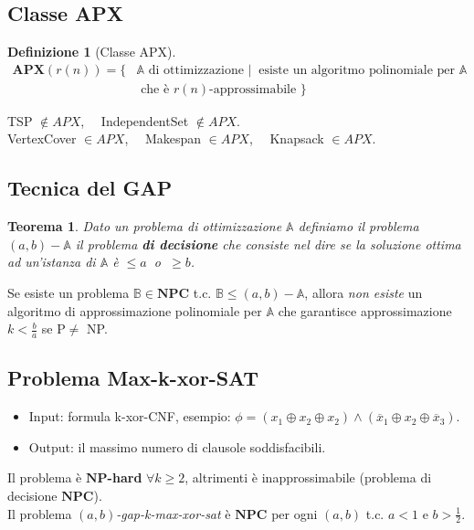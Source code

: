 \documentclass[a4paper]{article}
\newtheorem{thm}{Teorema}[subsection]
\theoremstyle{definition}
\newtheorem{definit}{Definizione}[subsection]
\newcommand{\np}{\mathbf{NP}}
\newcommand{\npc}{\mathbf{NPC}}
\newcommand{\apx}{\mathbf{APX}}
\newcommand{\prob}[1]{\mathbb{#1}}
\begin{document}
		\subsection{Classe APX}
			\begin{definit}[Classe APX]
				\begin{align*}
					\apx(r(n)) = \big\lbrace & \prob{A} \text{ di ottimizzazione } \Big| \ \text{ esiste un algoritmo polinomiale per } \prob{A} \\
					& \text{ che è } r(n)\text{-approssimabile } \big\rbrace
				\end{align*}
			\end{definit}
		
		\noindent
		TSP $\notin APX$, ~~IndependentSet $\notin APX$.\\
		VertexCover $\in APX$, ~~Makespan $\in APX$, ~~Knapsack $\in APX$.
		
		\subsection{Tecnica del GAP}
			\begin{thm}
				Dato un problema di ottimizzazione $ \prob{A} $ definiamo il problema $ (a, b) - \prob{A} $ il problema \textbf{di decisione} che consiste nel dire se la soluzione ottima ad un'istanza di $ \prob{A} $ è $ \leq a \ $ o $ \ \geq b $.
			\end{thm}
		
		\noindent
		Se esiste un problema $\prob{B} \in \npc$ t.c. $\mathbb{B} \leq (a,b)-\prob{A}$, allora \textit{non esiste} un algoritmo di approssimazione polinomiale per $\prob{A}$ che garantisce approssimazione $k < \frac{b}{a}$ se P$\neq$ NP.
		
		\subsection{Problema Max-k-xor-SAT}
			\begin{itemize}
				\item Input: formula k-xor-CNF, esempio: $ \phi = (x_1 \oplus x_2\oplus x_2) \wedge (\overline{x}_1 \oplus x_2 \oplus \overline{x}_3) $.
				\item Output: il massimo numero di clausole soddisfacibili.
			\end{itemize}
		
		\noindent
		Il problema è $\np$\textbf{-hard} $\forall k \geq 2$, altrimenti è inapprossimabile (problema di decisione $\npc$).\\
		Il problema $(a,b)$\textit{-gap-k-max-xor-sat} è $\npc$ per ogni $(a, b)$ t.c. $a<1$ e $b > \frac{1}{2}$.
		
\end{document}
